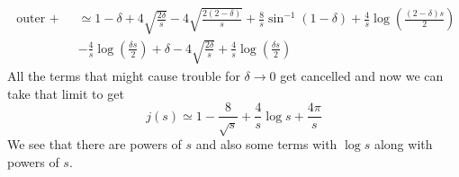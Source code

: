 ﻿\documentclass[12pt,a4paper]{article}
\begin{document}
$$
\begin{aligned}
\text { outer + inner } &\simeq  1-\delta+4 \sqrt{\frac{2\delta}{s}}-4 \sqrt{\frac{2(2-\delta)}{s}} + \frac{8}{s}\sin^{-1}(1-\delta) +\frac{4}{s} \log \left(\frac{(2-\delta)s}{2} \right)\\
&-\frac{4}{s}\log \left(\frac{\delta s}{2} \right)+\delta-4 \sqrt{\frac{2 \delta}{s}}+\frac{4}{s} \log\left( \frac{\delta s}{2}\right)
\end{aligned}
$$
All the terms that might cause trouble for $\delta \rightarrow 0$ get cancelled and now we can take that limit to get
$$
j(s) \simeq 1-\frac{8}{\sqrt{s}}+\frac{4}{s} \log s+\frac{4 \pi}{s}
$$
We see that there are powers of $s$ and also some terms with $\log s$ along with powers of $s$. 
\end{document}
